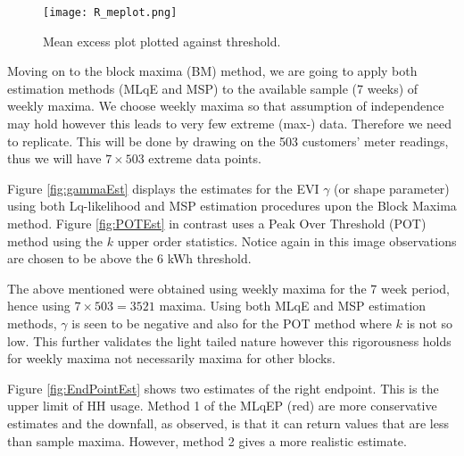 \documentclass[a4paper]{article}
\begin{document}


\begin{figure}
\centering
\texttt{[image: R\_meplot.png]}
\caption{\label{fig:r_me} Mean excess plot plotted against threshold.}
\end{figure}

Moving on to the block maxima (BM) method, we are going to apply both estimation methods (MLqE and MSP) to the available sample (7 weeks) of weekly maxima. We choose weekly maxima so that assumption of independence may hold however this leads to very few extreme (max-) data. Therefore we need to replicate. This will be done by drawing on the 503 customers' meter readings, thus we will have $7 \times 503$ extreme data points.

Figure \ref{fig:gammaEst} displays the estimates for the EVI $\gamma$ (or shape parameter) using both Lq-likelihood and MSP estimation procedures upon the Block Maxima method. Figure \ref{fig:POTEst} in contrast uses a Peak Over Threshold (POT) method using the $k$ upper order statistics. Notice again in this image observations are chosen to be above the 6 kWh threshold.

The above mentioned were obtained using weekly maxima for the 7 week period, hence using $7 \times 503= 3521$ maxima. Using both MLqE and MSP estimation methods, $\gamma$ is seen to be negative and also for the POT method where $k$ is not so low. This further validates the light tailed nature however this rigorousness holds for weekly maxima not necessarily maxima for other blocks. 

Figure \ref{fig:EndPointEst}  shows two estimates of the right endpoint. This is the upper limit of HH usage. Method 1 of the MLqEP (red) are more conservative estimates and the downfall, as observed, is that it can return values that are less than sample maxima. However, method 2 gives a more realistic estimate.
\end{document}
